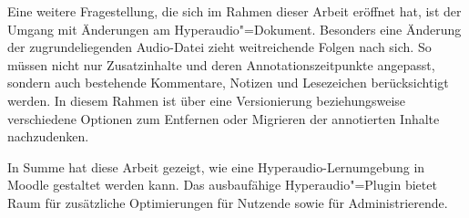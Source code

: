 Eine weitere Fragestellung, die sich im Rahmen dieser Arbeit eröffnet hat, ist der Umgang mit Änderungen am Hyperaudio"=Dokument. Besonders eine Änderung der zugrundeliegenden Audio-Datei zieht weitreichende Folgen nach sich. So müssen nicht nur Zusatzinhalte und deren Annotationszeitpunkte angepasst, sondern auch bestehende Kommentare, Notizen und Lesezeichen berücksichtigt werden. In diesem Rahmen ist über eine Versionierung beziehungsweise verschiedene Optionen zum Entfernen oder Migrieren der annotierten Inhalte nachzudenken.

In Summe hat diese Arbeit gezeigt, wie eine Hyperaudio-Lernumgebung in Moodle gestaltet werden kann. Das ausbaufähige Hyperaudio"=Plugin bietet Raum für zusätzliche Optimierungen für Nutzende sowie für Administrierende.